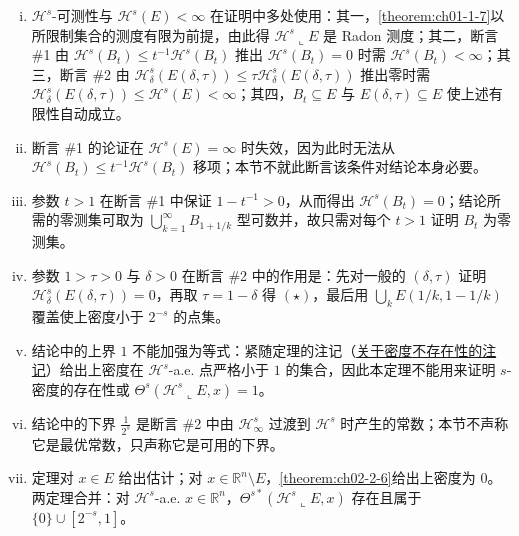 \documentclass[../../main.tex]{subfiles}%
\begin{document}
\begin{remark}\label{remark:ch02-thm-2-7-条件}
\begin{enumerate}[(i)]
\item $\mathcal{H}^s$-可测性与 $\mathcal{H}^s(E)<\infty$ 在证明中多处使用：其一，\cref{theorem:ch01-1-7}以所限制集合的测度有限为前提，由此得 $\mathcal{H}^s\llcorner E$ 是 Radon 测度；其二，断言 \#1 由 $\mathcal{H}^s(B_t)\leqslant t^{-1}\mathcal{H}^s(B_t)$ 推出 $\mathcal{H}^s(B_t)=0$ 时需 $\mathcal{H}^s(B_t)<\infty$；其三，断言 \#2 由 $\mathcal{H}^s_\delta(E(\delta,\tau))\leqslant\tau\mathcal{H}^s_\delta(E(\delta,\tau))$ 推出零时需 $\mathcal{H}^s_\delta(E(\delta,\tau))\leqslant\mathcal{H}^s(E)<\infty$；其四，$B_t\subseteq E$ 与 $E(\delta,\tau)\subseteq E$ 使上述有限性自动成立。%
\item 断言 \#1 的论证在 $\mathcal{H}^s(E)=\infty$ 时失效，因为此时无法从 $\mathcal{H}^s(B_t)\leqslant t^{-1}\mathcal{H}^s(B_t)$ 移项；本节不就此断言该条件对结论本身必要。
\item 参数 $t>1$ 在断言 \#1 中保证 $1-t^{-1}>0$，从而得出 $\mathcal{H}^s(B_t)=0$；结论所需的零测集可取为 $\bigcup_{k=1}^{\infty}B_{1+1/k}$ 型可数并，故只需对每个 $t>1$ 证明 $B_t$ 为零测集。
\item 参数 $1>\tau>0$ 与 $\delta>0$ 在断言 \#2 中的作用是：先对一般的 $(\delta,\tau)$ 证明 $\mathcal{H}^s_\delta(E(\delta,\tau))=0$，再取 $\tau=1-\delta$ 得 $(\star)$，最后用 $\bigcup_kE(1/k,1-1/k)$ 覆盖使上密度小于 $2^{-s}$ 的点集。
\item 结论中的上界 $1$ 不能加强为等式：紧随定理的注记（\hyperref[remark:ch02-thm-2-7-边界]{关于密度不存在性的注记}）给出上密度在 $\mathcal{H}^s$-a.e. 点严格小于 $1$ 的集合，因此本定理不能用来证明 $s$-密度的存在性或 $\Theta^s(\mathcal{H}^s\llcorner E,x)=1$。
\item 结论中的下界 $\frac{1}{2^s}$ 是断言 \#2 中由 $\mathcal{H}^s_\infty$ 过渡到 $\mathcal{H}^s$ 时产生的常数；本节不声称它是最优常数，只声称它是可用的下界。
\item 定理对 $x\in E$ 给出估计；对 $x\in\mathbb{R}^n\setminus E$，\cref{theorem:ch02-2-6}给出上密度为 $0$。两定理合并：对 $\mathcal{H}^s$-a.e. $x\in\mathbb{R}^n$，$\Theta^{s*}(\mathcal{H}^s\llcorner E,x)$ 存在且属于 $\{0\}\cup[2^{-s},1]$。%
\end{enumerate}
\end{remark}
\end{document}
